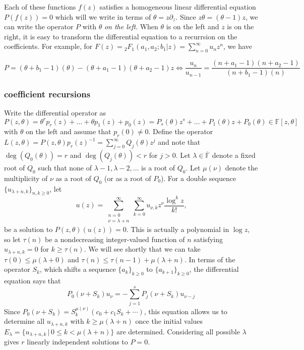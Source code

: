 \documentclass[12pt]{article}
\numberwithin{equation}{section}
\newcommand{\FFf}[5] {{}_{#1}{#2}_{#3} \left(#4 | {#5} \right)}
\begin{document}
Each of these functions $f(z)$ satisfies a homogeneous linear differential equation $P(f(z))=0$ which will we write in terms of $\theta = z \partial_z$. Since $z\theta = (\theta - 1)z$, we can write the operator $P$ with $\theta$ \emph{on the left}. When $\theta$ is on the left and $z$ is on the right, it is easy to transform the differential equation to a recurrsion on the coefficients. For example, for $F(z) = \FFf{2}{F}{1}{a_1,a_2;b_1}{z} = \sum_{n=0}^{\infty}{u_n} z^n$, we have

\begin{equation*}
P = (\theta+b_1-1)(\theta) - (\theta+a_1-1)(\theta+a_2-1)z \Leftrightarrow \frac{u_n}{u_{n-1}} = \frac{(n+a_1-1)(n+a_2-1)}{(n+b_1-1)(n)}
\end{equation*}

\subsubsection{coefficient recursions}
Write the differential operator as $P(z,\theta) = \theta^r p_r(z) + \dots + \theta p_1(z) + p_0(z) = P_s(\theta) z^s + \dots + P_1(\theta) z + P_0(\theta) \in\mathbb{F}[z,\theta]$ with $\theta$ on the left and assume that $p_r(0) \neq 0$. Define the operator $L(z,\theta) = P(z,\theta) p_r(z)^{-1} = \sum_{j=0}^{\infty} Q_j(\theta) z^j$ and note that $\deg(Q_0(\theta)) = r$ and $\deg(Q_j(\theta)) < r$ for $j > 0$. Let $\lambda \in \overline{\mathbb{F}}$ denote a fixed root of $Q_0$ such that none of $\lambda-1, \lambda-2, \dots$ is a root of $Q_0$. Let $\mu(\nu)$ denote the multiplicity of $\nu$ as a root of $Q_0$ (or as a root of $P_0$). For a double sequence $\{u_{\lambda + n, k}\}_{n,k \ge 0}$, let
\begin{equation*}
u(z) = \sum_{\substack{n=0 \\ \nu=\lambda+n}}^{\infty} \sum_{k=0}^{\infty} u_{\nu,k} z^{\nu} \frac{\log^k z}{k!}\text{,}
\end{equation*}
be a solution to $P(z,\theta)(u(z)) = 0$. This is actually a polynomial in $\log z$, so let $\tau(n)$ be a nondecreasing integer-valued function of $n$ satisfying 
$u_{\lambda+n, k} = 0$ for $k \ge \tau(n)$. We will see shortly that we can take $\tau(0) \le \mu(\lambda + 0)$ and $\tau(n) \le \tau(n-1)+\mu(\lambda+n)$. In terms of the operator $S_k$, which shifts a sequence $\{a_k\}_{k \ge 0}$ to $\{a_{k+1}\}_{k \ge 0}$, the differential equation says that
\begin{equation*}
P_0(\nu + S_k) u_{\nu} = - \sum_{j=1}^{s} P_j(\nu + S_k) u_{\nu - j}
\end{equation*}
Since $P_0(\nu + S_k) = S_k^{\mu(\nu)}( c_0 + c_1 S_k + \cdots )$, this equation allows us to determine all $u_{\lambda+n, k}$ with $k \ge \mu(\lambda+n)$ once the initial values $E_{\lambda} = \{u_{\lambda+n, k} \, | \, 0 \le k < \mu(\lambda+n)\}$ are determined. Considering all possible $\lambda$ gives $r$ linearly independent solutions to $P=0$.
\end{document}
